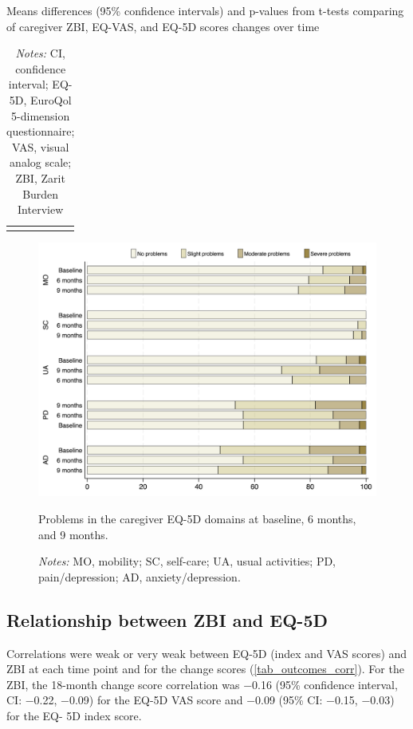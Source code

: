 \documentclass[12pt]{article}
\begin{document}
\begin{table}[H]
    \centering \singlespacing \small
    \caption{Means differences (95\% confidence intervals) and p-values from t-tests comparing of caregiver ZBI, EQ-VAS, and EQ-5D scores changes over time}
    \begin{tabular}{|L{6cm}|C{5cm}|C{2.5cm}|}
        \hline
    \end{tabular}
    \label{tab_outcomes_time}
    \caption*{\footnotesize 
                \textit{Notes:} CI, confidence interval; EQ-5D, EuroQol 5-dimension questionnaire; VAS, visual analog scale; ZBI, Zarit Burden Interview}
\end{table}

\begin{figure}[H]
    \centering
    \includegraphics[width=1\linewidth]{figures/eq5d-domains-time.png}
    \caption{Problems in the caregiver EQ-5D domains at baseline, 6 months, and 9 months.}
    \label{fig:eq5d-domains-time}
    \caption*{\footnotesize \textit{Notes:} MO, mobility; SC, self-care; UA, usual activities; PD, pain/depression; AD, anxiety/depression.}
\end{figure}

\subsection*{Relationship between ZBI and EQ-5D}
Correlations were weak or very weak between EQ-5D (index and VAS scores) and ZBI at each time point and for the change scores (\autoref{tab_outcomes_corr}). For the ZBI, the 18-month change score correlation was −0.16 (95\% confidence interval, CI: −0.22, −0.09) for the EQ-5D VAS score and −0.09 (95\% CI: −0.15, −0.03) for the EQ- 5D index score.
\end{document}
